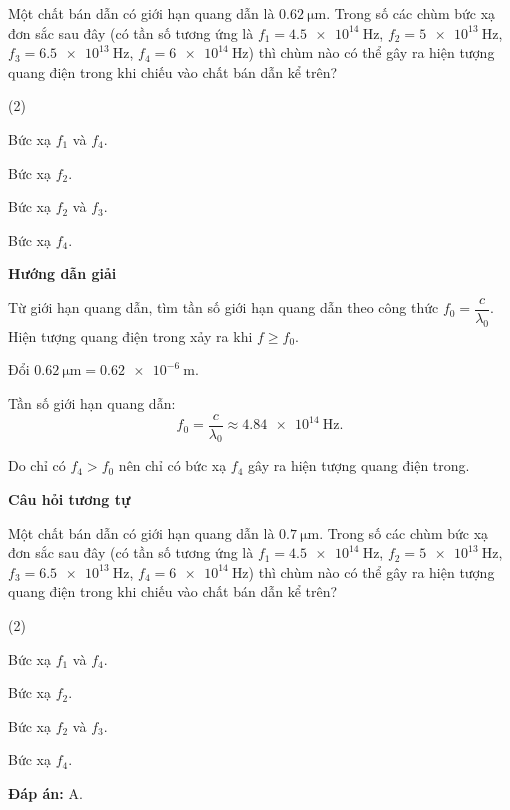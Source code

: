 {Một chất bán dẫn có giới hạn quang dẫn là $\SI{0.62}{\micro \meter}$. Trong số các chùm bức xạ đơn sắc sau đây (có tần số tương ứng là $f_1=\SI{4.5e14}{\hertz}$, $f_2=\SI{5e13}{\hertz}$, $f_3=\SI{6.5e13}{\hertz}$, $f_4=\SI{6e14}{\hertz}$) thì chùm nào có thể gây ra hiện tượng quang điện trong khi chiếu vào chất bán dẫn kể trên?
\begin{mcq}(2)
	\item Bức xạ $f_1$ và $f_4$.
	\item Bức xạ $f_2$.
	\item Bức xạ $f_2$ và $f_3$.
	\item Bức xạ $f_4$.
\end{mcq}
}{\begin{center}
	\textbf{Hướng dẫn giải}
\end{center}

Từ giới hạn quang dẫn, tìm tần số giới hạn quang dẫn theo công thức $f_0=\dfrac{c}{\lambda_0}$. Hiện tượng quang điện trong xảy ra khi $f \geq f_0$.

Đổi $\SI{0.62}{\micro \meter} = \SI{0.62e-6}{\meter}$.

Tần số giới hạn quang dẫn:
\begin{equation*}
	f_0=\dfrac{c}{\lambda_0} \approx \SI{4.84e14}{\hertz}.
\end{equation*}

Do chỉ có $f_4 > f_0$ nên chỉ có bức xạ $f_4$ gây ra hiện tượng quang điện trong.

\begin{center}
	\textbf{Câu hỏi tương tự}
\end{center}

Một chất bán dẫn có giới hạn quang dẫn là $\SI{0.7}{\micro \meter}$. Trong số các chùm bức xạ đơn sắc sau đây (có tần số tương ứng là $f_1=\SI{4.5e14}{\hertz}$, $f_2=\SI{5e13}{\hertz}$, $f_3=\SI{6.5e13}{\hertz}$, $f_4=\SI{6e14}{\hertz}$) thì chùm nào có thể gây ra hiện tượng quang điện trong khi chiếu vào chất bán dẫn kể trên?
\begin{mcq}(2)
	\item Bức xạ $f_1$ và $f_4$.
	\item Bức xạ $f_2$.
	\item Bức xạ $f_2$ và $f_3$.
	\item Bức xạ $f_4$.
\end{mcq}

\textbf{Đáp án:} A.
}

